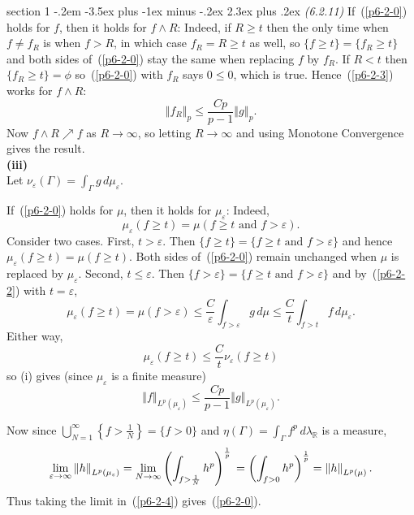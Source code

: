 \documentclass[12pt]{article}
\makeatletter
\theoremstyle{norm}
\newcommand{\R}[0]{\mathbb{R}}
\newcommand{\rc}[1]{\frac{1}{#1}}
\newcommand{\Ga}[0]{\Gamma}
\newcommand{\ep}[0]{\varepsilon}
\newcommand{\la}[0]{\lambda}
\newcommand{\bc}[1]{\left\{ {#1} \right\}}
\newcommand{\pa}[1]{\left( {#1} \right)}
\newcommand{\ve}[1]{\left\Vert {#1}\right\Vert}
\newcommand{\subprob}[1]{\noindent\textbf{#1}\\}
\newcommand{\iy}[0]{\infty}
\newenvironment{problem}{\@startsection
       {section}
       {1}
       {-.2em}
       {-3.5ex plus -1ex minus -.2ex}
       {2.3ex plus .2ex}
       {\pagebreak[3]%
       \large\bf\noindent{Problem }
       }
       }
       {%
       }
\makeatother
\begin{document}
\begin{problem}{\it (6.2.11)}
If~(\ref{p6-2-0}) holds for $f$, then it holds for $f\wedge R$: Indeed, if $R\ge t$ then the only time when $f\neq f_R$ is when $f>R$, in which case $f_R=R\ge t$ as well, so $\{f\ge t\}=\{f_R\ge t\}$ and both sides of~(\ref{p6-2-0}) stay the same when replacing $f$ by $f_R$. If $R<t$ then $\{f_R\ge t\}=\phi$ so~(\ref{p6-2-0}) with $f_R$ says $0\le 0$, which is true.
Hence~(\ref{p6-2-3}) works for $f\wedge R$:
\[\ve{f_R}_p\le \frac{Cp}{p-1}\ve{g}_p.\]
Now $f\wedge R\nearrow f$ as $R\to \iy$, so letting $R\to \iy$ and using Monotone Convergence gives the result.\\

\subprob{(iii)}
Let $\nu_{\ep}(\Ga)=\int_{\Ga}g\,d\mu_{\ep}$.

If~(\ref{p6-2-0}) holds for $\mu$, then it holds for $\mu_{\ep}$: Indeed,
\[
\mu_{\ep}(f\ge t)=\mu(f\ge t\text{ and }f>\ep).
\]
Consider two cases. First, $t>\ep$. Then $\{f\ge t\}=\{f\ge t\text{ and }f>\ep\}$ and hence $\mu_{\ep}(f\ge t)=\mu(f\ge t)$. Both sides of~(\ref{p6-2-0}) remain unchanged when %
$\mu$ is replaced by $\mu_{\ep}$. Second, $t\le \ep$. Then $\{f>\ep\}=\{f\ge t\text{ and }f>\ep\}$ and by~(\ref{p6-2-2}) with $t=\ep$, 
\[
\mu_{\ep} (f\ge t)=\mu(f>\ep)\le \frac C{\ep}\int_{f>\ep} g\,d\mu\le \frac Ct\int_{f>t} f\,d\mu_{\ep}.
\]
Either way,
\[
\mu_{\ep}(f\ge t)\le \frac Ct\nu_{\ep}(f\ge t)
\]
so (i) gives (since $\mu_{\ep}$ is a finite measure) %
\begin{equation}\label{p6-2-4}
\ve{f}_{L^p(\mu_{\ep})}\le \frac{Cp}{p-1}\ve{g}_{L^p(\mu_{\ep})}.
\end{equation}

Now since $\bigcup_{N=1}^{\iy} \bc{f>\rc{N}}=\{f>0\}$ and $\eta(\Ga)=\int_{\Ga}f^p\,d\la_{\R}$ is a measure, 
\[
\lim_{\ep\to \iy} \ve{h}_{L^p(\mu_{\ep})}
=\lim_{N\to \iy} \pa{\int_{f>\rc N} h^p}^{\rc p}\\
=\pa{\int_{f>0} h^p}^{\rc p}
=\ve{h}_{L^p(\mu)}.
\]
Thus taking the limit in~(\ref{p6-2-4}) gives~(\ref{p6-2-0}).
\end{problem}
\end{document}
